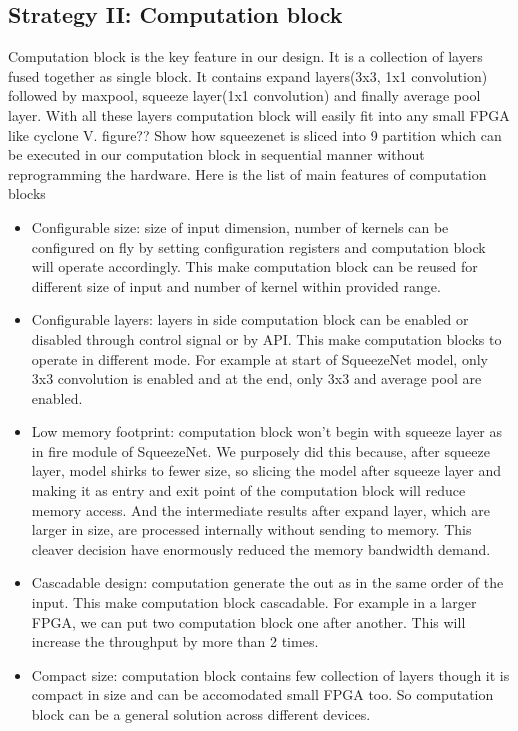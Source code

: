 \documentclass[conference]{IEEEtran}
\begin{document}
\subsection{Strategy II: Computation block}
Computation block is the key feature in our design. It is a collection of layers fused together as single block. It contains expand layers(3x3, 1x1 convolution) followed by maxpool, squeeze layer(1x1 convolution) and finally average pool layer. With all these layers computation block will easily fit into any small FPGA like cyclone V. figure?? Show how squeezenet is sliced into 9 partition which can be executed in our computation block in sequential manner without reprogramming the hardware. Here is the list of main features of computation blocks

\begin{itemize}
\item Configurable size: size of input dimension, number of kernels can be configured on fly by setting configuration registers and computation block will operate accordingly. This make computation block can be reused for different size of input and number of kernel within provided range.

\item Configurable layers: layers in side computation block can be enabled or disabled through control signal or by API. This make computation blocks to operate in different mode. For example at start of SqueezeNet model, only 3x3 convolution  is enabled and at the end, only 3x3 and average pool are enabled.

\item Low memory footprint: computation block won't begin with squeeze layer as in fire module of SqueezeNet. We purposely did this because, after squeeze layer, model shirks to fewer size, so slicing the model after squeeze layer and making it as entry and exit point of the computation block will reduce memory access. And the intermediate results after expand layer, which are larger in size, are processed internally without sending to memory. This cleaver decision have enormously reduced the memory bandwidth demand. 

\item Cascadable design: computation generate the out as in the same order of the input. This make computation block cascadable. For example in a larger FPGA, we can put two computation block one after another. This will increase the throughput by more than 2 times.

\item Compact size: computation block contains few collection of layers though it is compact in size and can be accomodated small FPGA too. So computation block can be a general solution across different devices.

\end{itemize}
\end{document}
